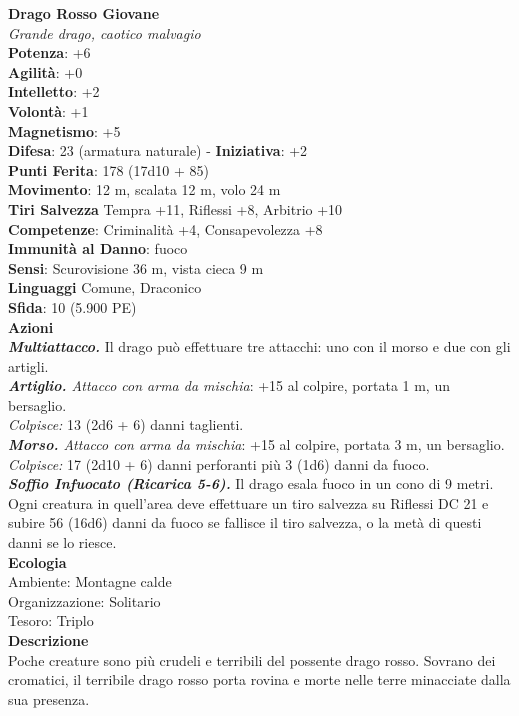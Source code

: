 \begin{multicols}{2}
\medskip\textbf{Drago Rosso Giovane}\\
\emph{Grande drago, caotico malvagio}\\
\textbf{Potenza}: +6\\
\textbf{Agilità}: +0\\
\textbf{Intelletto}: +2\\
\textbf{Volontà}: +1\\
\textbf{Magnetismo}: +5\\
\textbf{Difesa}: 23 (armatura naturale) - \textbf{Iniziativa}: +2\\
\textbf{Punti Ferita}: 178 (17d10 + 85)\\
\textbf{Movimento}: 12 m, scalata 12 m, volo 24 m\\
\textbf{Tiri Salvezza} Tempra +11, Riflessi +8, Arbitrio +10\\
\textbf{Competenze}: Criminalità +4, Consapevolezza +8\\
\textbf{Immunità al Danno}: fuoco\\
\textbf{Sensi}: Scurovisione 36 m, vista cieca 9 m\\
\textbf{Linguaggi} Comune, Draconico\\
\textbf{Sfida}: 10 (5.900 PE)\smallskip\\
\smallskip\textbf{Azioni}\\
\emph{\textbf{Multiattacco.}} Il drago può effettuare tre attacchi: uno con il morso e due con gli artigli.\\
\emph{\textbf{Artiglio.} Attacco con arma da mischia}: +15 al colpire, portata 1 m, un bersaglio.\\
\emph{Colpisce:} 13 (2d6 + 6) danni taglienti. \\
\emph{\textbf{Morso.} Attacco con arma da mischia}: +15 al colpire, portata 3 m, un bersaglio.\\
\emph{Colpisce:} 17 (2d10 + 6) danni perforanti più 3 (1d6) danni da fuoco.\\
\emph{\textbf{Soffio Infuocato (Ricarica 5-6).}} Il drago esala fuoco in un cono di 9 metri. Ogni creatura in quell'area deve effettuare un tiro salvezza su Riflessi DC  21 e subire 56 (16d6) danni da fuoco se fallisce il tiro salvezza, o la metà di questi danni se lo riesce.\\
\textbf{Ecologia}\\
Ambiente: Montagne calde\\
Organizzazione: Solitario\\
Tesoro: Triplo\\
\textbf{Descrizione}\\
Poche creature sono più crudeli e terribili del possente drago rosso. Sovrano dei cromatici, il terribile drago rosso porta rovina e morte nelle terre minacciate dalla sua presenza.\\


\end{multicols}
